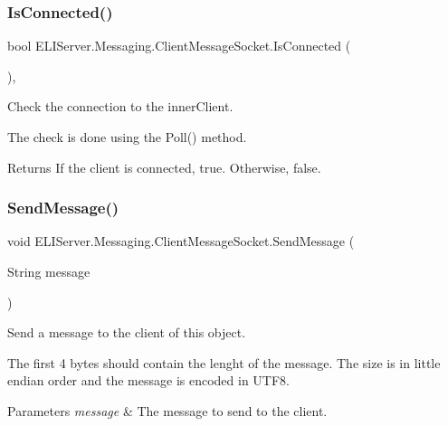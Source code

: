\subsubsection{\texorpdfstring{Is\+Connected()}{IsConnected()}}
{\footnotesize\ttfamily bool E\+L\+I\+Server.\+Messaging.\+Client\+Message\+Socket.\+Is\+Connected (\begin{DoxyParamCaption}{ }\end{DoxyParamCaption})\hspace{0.3cm}{\ttfamily [inline]}, {\ttfamily [package]}}





Check the connection to the inner\+Client.

The check is done using the Poll() method. 

\begin{DoxyReturn}{Returns}
If the client is connected, true. Otherwise, false.
\end{DoxyReturn}
\mbox{\label{class_e_l_i_server_1_1_messaging_1_1_client_message_socket_a0b1b4e6b86d3724706b8abf34a7a061c}} 
\subsubsection{\texorpdfstring{Send\+Message()}{SendMessage()}}
{\footnotesize\ttfamily void E\+L\+I\+Server.\+Messaging.\+Client\+Message\+Socket.\+Send\+Message (\begin{DoxyParamCaption}\item[{String}]{message }\end{DoxyParamCaption})\hspace{0.3cm}{\ttfamily [inline]}}





Send a message to the client of this object.

The first 4 bytes should contain the lenght of the message. The size is in little endian order and the message is encoded in U\+T\+F8. 


\begin{DoxyParams}{Parameters}
{\em message} & The message to send to the client.\\
\hline
\end{DoxyParams}


